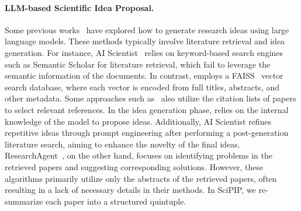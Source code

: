 \documentclass{article}
\theoremstyle{plain}
\theoremstyle{definition}
\theoremstyle{remark}
\begin{document}
\paragraph{LLM-based Scientific Idea Proposal.} Some previous works~\citep{DBLP:journals/corr/abs-2409-14634,DBLP:journals/corr/abs-2410-09403,DBLP:conf/acl/XuSXFWZ23,DBLP:journals/corr/abs-2410-14255,DBLP:journals/corr/abs-2408-06292,DBLP:journals/corr/abs-2404-07738,DBLP:conf/acl/0005DJH24} have explored how to generate research ideas using large language models. These methods typically involve literature retrieval and idea generation. For instance, AI Scientist~\citep{DBLP:journals/corr/abs-2408-06292} relies on keyword-based search engines such as Semantic Scholar for literature retrieval, which fail to leverage the semantic information of the documents. In contrast, \citep{DBLP:journals/corr/abs-2410-09403} employs a FAISS~\citep{johnson2019billion} vector search database, where each vector is encoded from full titles, abstracts, and other metadata. Some approaches such as~\citep{DBLP:journals/corr/abs-2404-07738} also utilize the citation lists of papers to select relevant references.
In the idea generation phase, \citep{DBLP:journals/corr/abs-2408-06292} relies on the internal knowledge of the model to propose ideas. Additionally, AI Scientist refines repetitive ideas through prompt engineering after performing a post-generation literature search, aiming to enhance the novelty of the final ideas. ResearchAgent~\citep{DBLP:journals/corr/abs-2404-07738}, on the other hand, focuses on identifying problems in the retrieved papers and suggesting corresponding solutions.
However, these algorithms primarily utilize only the abstracts of the retrieved papers, often resulting in a lack of necessary details in their methods. In SciPIP, we re-summarize each paper into
a structured quintuple.
\end{document}
